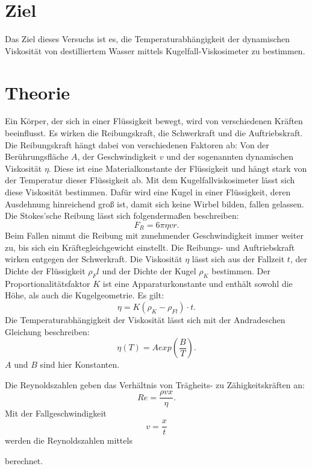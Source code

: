 \section{Ziel}
Das Ziel dieses Versuchs ist es, die Temperaturabhängigkeit
der dynamischen Viskosität von destilliertem Wasser mittels
Kugelfall-Viskosimeter zu bestimmen.

\section{Theorie}
\label{sec:Theorie}

Ein Körper, der sich in einer Flüssigkeit bewegt, wird von verschiedenen Kräften beeinflusst. 
Es wirken die Reibungskraft, die Schwerkraft und die Auftriebskraft. 
Die Reibungskraft hängt dabei von verschiedenen Faktoren ab:
Von der Berührungsfläche $A$, der Geschwindigkeit $v$ und
der sogenannten dynamischen Viskosität $\eta$. 
Diese ist eine Materialkonstante der Flüssigkeit und hängt stark von der Temperatur dieser Flüssigkeit ab. 
\newline
Mit dem Kugelfallviskosimeter lässt sich diese Viskosität bestimmen. 
Dafür wird eine Kugel in einer Flüssigkeit, deren Ausdehnung hinreichend groß ist, 
damit sich keine Wirbel bilden, fallen gelassen. 
Die Stokes'sche Reibung lässt sich folgendermaßen beschreiben:
\begin{equation}
    F_R = 6\pi \eta v r.
    \label{eqn:stokes}
\end{equation}
Beim Fallen nimmt die Reibung mit zunehmender Geschwindigkeit immer weiter zu, 
bis sich ein Kräftegleichgewicht einstellt. 
Die Reibungs- und Auftriebskraft wirken entgegen der Schwerkraft. 
Die Viskosität $\eta$ lässt sich aus der Fallzeit $t$, 
der Dichte der Flüssigkeit $\rho_Fl$ und der Dichte der Kugel $\rho_K$ bestimmen.
Der Proportionalitätsfaktor $K$ ist eine Apparaturkonstante und enthält sowohl die Höhe,
als auch die Kugelgeometrie.
Es gilt:
\begin{equation}
    \eta = K (\rho_K -\rho_{Fl}) \cdot t.
    \label{eqn:eta}
\end{equation}
Die Temperaturabhängigkeit der Viskosität lässt sich mit der Andradeschen Gleichung 
beschreiben: 
\begin{equation}
    \eta(T) = A exp(\frac{B}{T}). %
    \label{eqn:Temperatur}
\end{equation}
$A$ und $B$ sind hier Konstanten.

Die Reynoldszahlen geben das Verhältnis von Trägheits- zu
Zähigkeitskräften an:
\begin{equation*}
    Re = \frac{\rho v x}{\eta}.
\end{equation*}
Mit der Fallgeschwindigkeit
\begin{equation*}
    v = \frac{x}{t}
\end{equation*}
werden die Reynoldszahlen mittels

berechnet.
